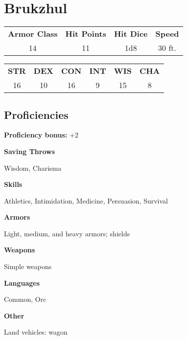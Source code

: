 \section{Brukzhul}\vspace{-8pt}
\quad{}

\hrulefill
\medskip

\begin{tabular}{cccc}
\textbf{Armor Class} & \textbf{Hit Points} & \textbf{Hit Dice} & \textbf{Speed} \\
 14 & 11  & 1d8 & 30 ft.
\end{tabular}

\hrulefill
\bigskip

\begin{tabular}{cccccc}
  \textbf{STR} & \textbf{DEX} & \textbf{CON} & \textbf{INT} & \textbf{WIS} & \textbf{CHA} \\
      16       &     10       &      16      &       9      &      15      &      8
\end{tabular}

\subsection*{Proficiencies}\vspace{-6pt}
\quad\enspace\textbf{Proficiency bonus:} $+2$ \par
\textbf{Saving Throws} \par
\qquad Wisdom, Charisma \par
\textbf{Skills} \par
\qquad Athletics, Intimidation, Medicine, Persuasion, Survival \par
\textbf{Armors} \par
\qquad Light, medium, and heavy armors; shields \par
\textbf{Weapons} \par
\qquad Simple weapons \par
\textbf{Languages} \par
\qquad Common, Orc \par
\textbf{Other} \par
\qquad Land vehicles: wagon\par


